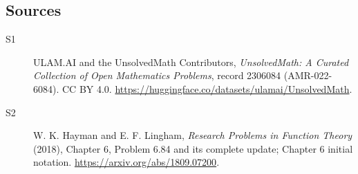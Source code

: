 \documentclass[11pt]{article}
\begin{document}
\subsection{Sources}
\begin{description}
\item[\hypertarget{source:2306084:1}{S1}] ULAM.AI and the UnsolvedMath Contributors, \emph{UnsolvedMath: A Curated Collection of Open Mathematics Problems}, record 2306084 (AMR-022-6084). CC BY 4.0. \url{https://huggingface.co/datasets/ulamai/UnsolvedMath}.
\item[\hypertarget{source:2306084:2}{S2}] W. K. Hayman and E. F. Lingham, \emph{Research Problems in Function Theory} (2018), Chapter 6, Problem 6.84 and its complete update; Chapter 6 initial notation. \url{https://arxiv.org/abs/1809.07200}.
\end{description}
\label{end:2306084}
\end{document}
